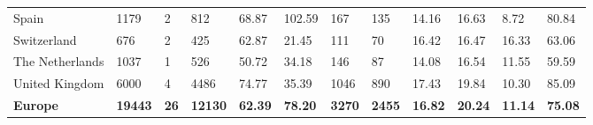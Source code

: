 \begin{tabular}{llllllllllll}
  Spain & 1179 & 2 & 812 & 68.87 & 102.59 & 167 & 135 & 14.16 & 16.63 & 8.72 & 80.84 \\ 
  Switzerland & 676 & 2 & 425 & 62.87 & 21.45 & 111 & 70 & 16.42 & 16.47 & 16.33 & 63.06 \\ 
  The Netherlands & 1037 & 1 & 526 & 50.72 & 34.18 & 146 & 87 & 14.08 & 16.54 & 11.55 & 59.59 \\ 
  United Kingdom & 6000 & 4 & 4486 & 74.77 & 35.39 & 1046 & 890 & 17.43 & 19.84 & 10.30 & 85.09 \\ 
  \textbf{Europe} & \textbf{19443} & \textbf{26} & \textbf{12130} & \textbf{62.39} & \textbf{78.20} & \textbf{3270} & \textbf{2455} & \textbf{16.82} & \textbf{20.24} & \textbf{11.14} & \textbf{75.08} \\ 
   \bottomrule
\end{tabular}
